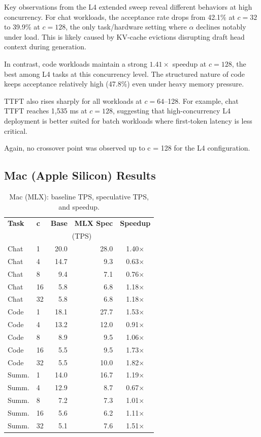 \documentclass[10pt,twocolumn]{article}
\begin{document}
Key observations from the L4 extended sweep reveal different behaviors at high concurrency. For chat workloads, the acceptance rate drops from 42.1\% at $c=32$ to 39.9\% at $c=128$, the only task/hardware setting where $\alpha$ declines notably under load. This is likely caused by KV-cache evictions disrupting draft head context during generation.

In contrast, code workloads maintain a strong $1.41\times$ speedup at $c=128$, the best among L4 tasks at this concurrency level. The structured nature of code keeps acceptance relatively high (47.8\%) even under heavy memory pressure.

TTFT also rises sharply for all workloads at $c=64$--128. For example, chat TTFT reaches 1,535 ms at $c=128$, suggesting that high-concurrency L4 deployment is better suited for batch workloads where first-token latency is less critical.

Again, no crossover point was observed up to c = 128 for the L4 configuration.

\subsection{Mac (Apple Silicon) Results}

\begin{table}[h]
\centering
\caption{Mac (MLX): baseline TPS, speculative TPS, and speedup.}
\label{tab:mac}
\small
\setlength{\tabcolsep}{4pt}
\begin{tabular}{llrrc}
\toprule
\textbf{Task} & \textbf{c} & \textbf{Base} & \textbf{MLX Spec} & \textbf{Speedup} \\
              &            & \multicolumn{2}{c}{(TPS)} & \\
\midrule
Chat & 1  & 20.0 & 28.0  & 1.40$\times$ \\
Chat & 4  & 14.7 & 9.3   & 0.63$\times$ \\
Chat & 8  & 9.4  & 7.1   & 0.76$\times$ \\
Chat & 16 & 5.8  & 6.8   & 1.18$\times$ \\
Chat & 32 & 5.8  & 6.8   & 1.18$\times$ \\
\midrule
Code & 1  & 18.1 & 27.7  & 1.53$\times$ \\
Code & 4  & 13.2 & 12.0  & 0.91$\times$ \\
Code & 8  & 8.9  & 9.5   & 1.06$\times$ \\
Code & 16 & 5.5  & 9.5   & 1.73$\times$ \\
Code & 32 & 5.5  & 10.0  & 1.82$\times$ \\
\midrule
Summ. & 1  & 14.0 & 16.7  & 1.19$\times$ \\
Summ. & 4  & 12.9 & 8.7   & 0.67$\times$ \\
Summ. & 8  & 7.2  & 7.3   & 1.01$\times$ \\
Summ. & 16 & 5.6  & 6.2   & 1.11$\times$ \\
Summ. & 32 & 5.1  & 7.6   & 1.51$\times$ \\
\bottomrule
\end{tabular}
\vspace{0.35cm}
\end{table}
\end{document}
